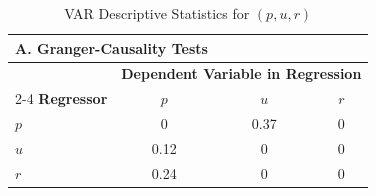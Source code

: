 \begin{table}[!htbp]
\centering
\caption{VAR Descriptive Statistics for $(p,u,r)$}

\begin{tabular}{lccc}
\hline
\multicolumn{4}{l}{\textbf{A. Granger-Causality Tests}} \\
\hline
 & \multicolumn{3}{c}{\textbf{Dependent Variable in Regression}} \\
\cline{2-4}
\textbf{Regressor} & $p$ & $u$ & $r$ \\
\hline
$p$ & 0 & 0.37 & 0 \\
$u$ & 0.12 & 0 & 0 \\
$r$ & 0.24 & 0 & 0 \\
\hline
\end{tabular}

\vspace{0.35cm}


\end{table}
